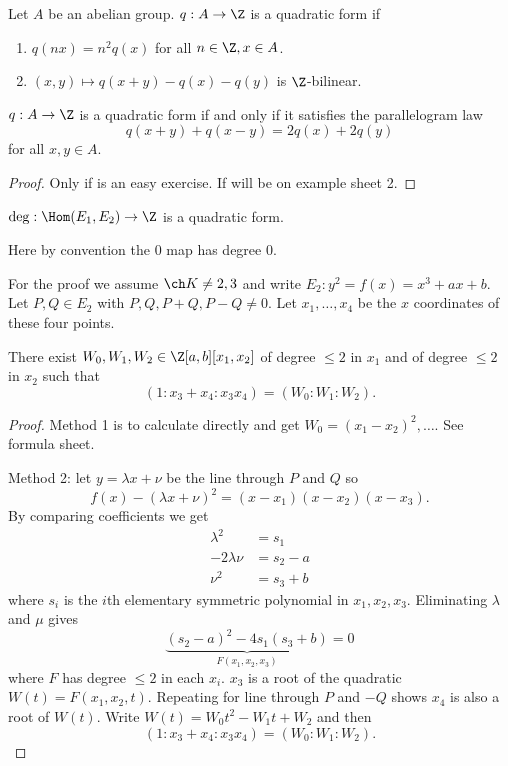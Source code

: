 \documentclass[a4paper]{article}
\theoremstyle{definition}
\begin{document}
\begin{definition}
  Let \(A\) be an abelian group. \(q: A \to \Z\) is a quadratic form if
  \begin{enumerate}
  \item \(q(nx) = n^2 q(x)\) for all \(n \in \Z, x \in A\).
  \item \((x, y) \mapsto q(x + y) - q(x) - q(y)\) is \(\Z\)-bilinear.
  \end{enumerate}
\end{definition}

\begin{lemma}
  \(q: A \to \Z\) is a quadratic form if and only if it satisfies the parallelogram law
  \[
    q(x + y) + q(x - y) = 2q(x) + 2q(y)
  \]
  for all \(x, y \in A\).
\end{lemma}

\begin{proof}
  Only if is an easy exercise. If will be on example sheet 2.
\end{proof}

\begin{theorem}
  \(\deg: \Hom(E_1, E_2) \to \Z\) is a quadratic form.
\end{theorem}
Here by convention the 0 map has degree \(0\).

For the proof we assume \(\ch K \neq 2, 3\) and write \(E_2: y^2 = f(x) = x^3 + ax + b\). Let \(P, Q \in E_2\) with \(P, Q, P + Q, P - Q \neq 0\). Let \(x_1, \dots, x_4\) be the \(x\) coordinates of these four points.

\begin{lemma}
  There exist \(W_0, W_1, W_2 \in \Z[a, b][x_1, x_2]\) of degree \(\leq 2\) in \(x_1\) and of degree \(\leq 2\) in \(x_2\) such that
  \[
    (1: x_3 + x_4: x_3x_4) = (W_0: W_1: W_2).
  \]
\end{lemma}

\begin{proof}
  Method 1 is to calculate directly and get \(W_0 = (x_1 - x_2)^2, \dots\). See formula sheet.

  Method 2: let \(y = \lambda x + \nu\) be the line through \(P\) and \(Q\) so
  \[
    f(x) - (\lambda x + \nu)^2 = (x - x_1)(x - x_2)(x - x_3).
  \]
  By comparing coefficients we get
  \begin{align*}
    \lambda^2 &= s_1 \\
    -2 \lambda \nu &= s_2 - a \\
    \nu^2 &= s_3 + b
  \end{align*}
  where \(s_i\) is the \(i\)th elementary symmetric polynomial in \(x_1, x_2, x_3\). Eliminating \(\lambda\) and \(\mu\) gives
  \[
    \underbrace{(s_2 - a)^2 - 4s_1 (s_3 + b)}_{F(x_1, x_2, x_3)} = 0
  \]
  where \(F\) has degree \(\leq 2\) in each \(x_i\). \(x_3\) is a root of the quadratic \(W(t) = F(x_1, x_2, t)\). Repeating for line through \(P\) and \(-Q\) shows \(x_4\) is also a root of \(W(t)\). Write \(W(t) = W_0t^2 - W_1t + W_2\) and then
  \[
    (1: x_3 + x_4: x_3x_4) = (W_0: W_1: W_2).
  \]
\end{proof}
\end{document}
